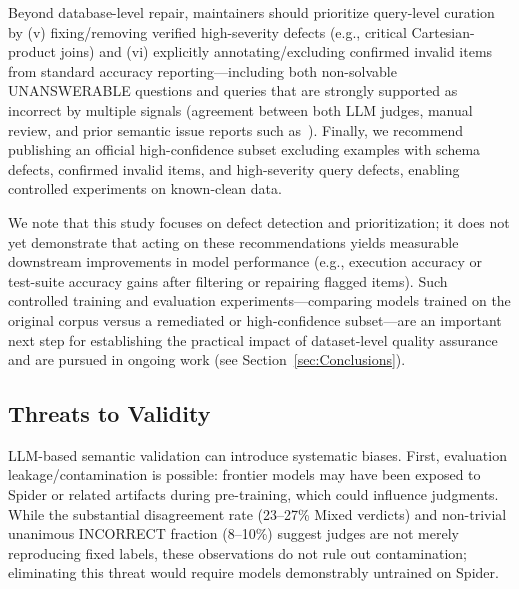 \documentclass[print]{einformatica}
\begin{document}
Beyond database-level repair, maintainers should prioritize query-level curation by (v) fixing/removing verified high-severity defects (e.g., critical Cartesian-product joins) and (vi) explicitly annotating/excluding confirmed invalid items from standard accuracy reporting---including both non-solvable UNANSWERABLE questions and queries that are strongly supported as incorrect by multiple signals (agreement between both LLM judges, manual review, and prior semantic issue reports such as~\cite{liu2025nl2sqlbugs}). Finally, we recommend publishing an official high-confidence subset excluding examples with schema defects, confirmed invalid items, and high-severity query defects, enabling controlled experiments on known-clean data.

We note that this study focuses on defect detection and prioritization; it does not yet demonstrate that acting on these recommendations yields measurable downstream improvements in model performance (e.g., execution accuracy or test-suite accuracy gains after filtering or repairing flagged items). Such controlled training and evaluation experiments---comparing models trained on the original corpus versus a remediated or high-confidence subset---are an important next step for establishing the practical impact of dataset-level quality assurance and are pursued in ongoing work (see Section~\ref{sec:Conclusions}).

\subsection{Threats to Validity}

LLM-based semantic validation can introduce systematic biases. First, evaluation leakage/contamination is possible: frontier models may have been exposed to Spider or related artifacts during pre-training, which could influence judgments. While the substantial disagreement rate (23--27\% Mixed verdicts) and non-trivial unanimous INCORRECT fraction (8--10\%) suggest judges are not merely reproducing fixed labels, these observations do not rule out contamination; eliminating this threat would require models demonstrably untrained on Spider.
\end{document}
